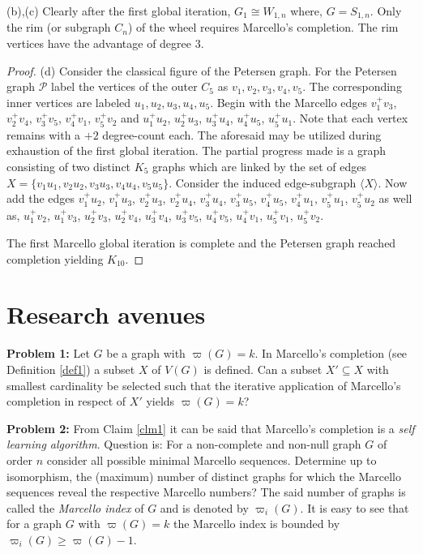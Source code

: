 \documentclass[12pt]{amsart}
\numberwithin{equation}{section}
\numberwithin{equation}{section}
\begin{document}
(b),(c) Clearly after the first global iteration, $G_1 \cong W_{1,n}$ where, $G = S_{1,n}$. Only the rim (or subgraph $C_n$) of the wheel requires Marcello's completion. The rim vertices have the advantage of degree $3$.
\begin{proof}
(d) Consider the classical figure of the Petersen graph. For the Petersen graph $\mathcal{P}$ label the vertices of the outer $C_5$ as $v_1,v_2,v_3,v_4,v_5$. The corresponding inner vertices are labeled $u_1,u_2,u_3,u_4,u_5$. Begin with the Marcello edges $v_1^+v_3$, $v^+_2v_4$, $v^+_3v_5$, $v^+_4v_1$, $v^+_5v_2$ and $u^+_1u_2$, $u^+_2u_3$, $u^+_3u_4$, $u^+_4u_5$, $u^+_5u_1$. Note that each vertex remains with a $+2$ degree-count each. The aforesaid may be utilized during exhaustion of the first global iteration. The partial progress made is a graph consisting of two distinct $K_5$ graphs which are linked by the set of edges $X = \{v_1u_1, v_2u_2, v_3u_3, v_4u_4, v_5u_5\}$. Consider the induced edge-subgraph $\langle X\rangle$. Now add the edges $v^+_1u_2$, $v^+_1u_3$, $v^+_2u_3$, $v^+_2u_4$, $v^+_3u_4$, $v^+_3u_5$, $v^+_4u_5$, $v^+_4u_1$, $v^+_5u_1$, $v^+_5u_2$ as well as, $u^+_1v_2$, $u^+_1v_3$, $u^+_2v_3$, $u^+_2v_4$, $u^+_3v_4$, $u^+_3v_5$, $u^+_4v_5$, $u^+_4v_1$, $u^+_5v_1$, $u^+_5v_2$.

The first Marcello global iteration is complete and the Petersen graph reached completion yielding $K_{10}$.
\end{proof}
\section{Research avenues}
\textbf{Problem 1:} Let $G$ be a graph with $\varpi(G) = k$. In Marcello's completion (see Definition \ref{def1}) a subset $X$ of $V(G)$ is defined. Can a subset $X'\subseteq X$ with smallest cardinality be selected such that the iterative application of Marcello's completion in respect of $X'$ yields $\varpi(G) = k$?

\textbf{Problem 2:} From Claim \ref{clm1} it can be said that Marcello's completion is a \emph{self learning algorithm}. Question is: For a non-complete and non-null graph $G$ of order $n$ consider all possible minimal Marcello sequences. Determine up to isomorphism, the (maximum) number of distinct graphs for which the Marcello sequences reveal the respective Marcello numbers? The said number of graphs is called the \emph{Marcello index} of $G$ and is denoted by $\varpi_i(G)$. It is easy to see that for a graph $G$ with $\varpi(G) = k$ the Marcello index is bounded by $\varpi_i(G) \geq \varpi(G) - 1$.
\end{document}

